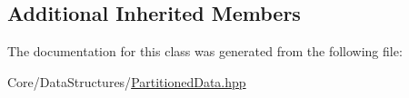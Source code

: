 \subsection*{Additional Inherited Members}


The documentation for this class was generated from the following file\+:\begin{DoxyCompactItemize}
\item 
Core/\+Data\+Structures/\mbox{\hyperlink{_partitioned_data_8hpp}{Partitioned\+Data.\+hpp}}\end{DoxyCompactItemize}
